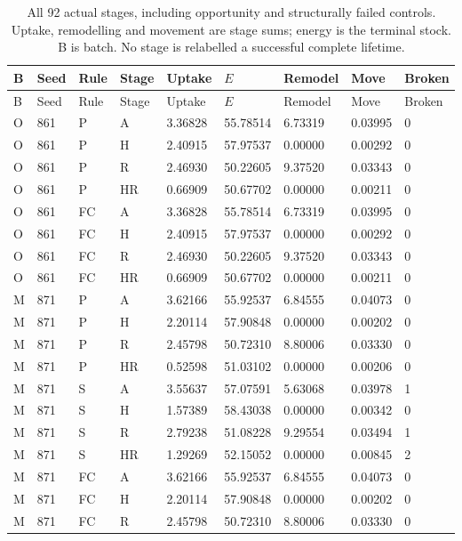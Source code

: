 \begin{longtable}{lllllllll}
\caption{All 92 actual stages, including opportunity and structurally failed controls. Uptake, remodelling and movement are stage sums; energy is the terminal stock. B is batch. No stage is relabelled a successful complete lifetime.}\label{tab:contact-stages}\\
\toprule
B & Seed & Rule & Stage & Uptake & $E$ & Remodel & Move & Broken\\
\midrule\endfirsthead
\toprule
B & Seed & Rule & Stage & Uptake & $E$ & Remodel & Move & Broken\\
\midrule\endhead
O & 861 & P & A & 3.36828 & 55.78514 & 6.73319 & 0.03995 & 0\\
O & 861 & P & H & 2.40915 & 57.97537 & 0.00000 & 0.00292 & 0\\
O & 861 & P & R & 2.46930 & 50.22605 & 9.37520 & 0.03343 & 0\\
O & 861 & P & HR & 0.66909 & 50.67702 & 0.00000 & 0.00211 & 0\\
O & 861 & FC & A & 3.36828 & 55.78514 & 6.73319 & 0.03995 & 0\\
O & 861 & FC & H & 2.40915 & 57.97537 & 0.00000 & 0.00292 & 0\\
O & 861 & FC & R & 2.46930 & 50.22605 & 9.37520 & 0.03343 & 0\\
O & 861 & FC & HR & 0.66909 & 50.67702 & 0.00000 & 0.00211 & 0\\
M & 871 & P & A & 3.62166 & 55.92537 & 6.84555 & 0.04073 & 0\\
M & 871 & P & H & 2.20114 & 57.90848 & 0.00000 & 0.00202 & 0\\
M & 871 & P & R & 2.45798 & 50.72310 & 8.80006 & 0.03330 & 0\\
M & 871 & P & HR & 0.52598 & 51.03102 & 0.00000 & 0.00206 & 0\\
M & 871 & S & A & 3.55637 & 57.07591 & 5.63068 & 0.03978 & 1\\
M & 871 & S & H & 1.57389 & 58.43038 & 0.00000 & 0.00342 & 0\\
M & 871 & S & R & 2.79238 & 51.08228 & 9.29554 & 0.03494 & 1\\
M & 871 & S & HR & 1.29269 & 52.15052 & 0.00000 & 0.00845 & 2\\
M & 871 & FC & A & 3.62166 & 55.92537 & 6.84555 & 0.04073 & 0\\
M & 871 & FC & H & 2.20114 & 57.90848 & 0.00000 & 0.00202 & 0\\
M & 871 & FC & R & 2.45798 & 50.72310 & 8.80006 & 0.03330 & 0\\

\end{longtable}
